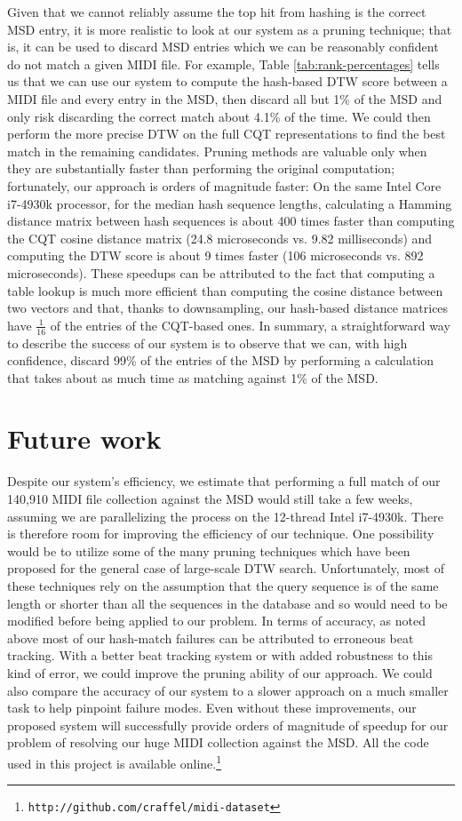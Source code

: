 \documentclass{article}
\begin{document}
Given that we cannot reliably assume the top hit from hashing is the correct MSD entry, it is more realistic to look at our system as a pruning technique; that is, it can be used to discard MSD entries which we can be reasonably confident do not match a given MIDI file.
For example, Table \ref{tab:rank-percentages} tells us that we can use our system to compute the hash-based DTW score between a MIDI file and every entry in the MSD, then discard all but 1\% of the MSD and only risk discarding the correct match about 4.1\% of the time.
We could then perform the more precise DTW on the full CQT representations to find the best match in the remaining candidates.
Pruning methods are valuable only when they are substantially faster than performing the original computation; fortunately, our approach is orders of magnitude faster:
On the same Intel Core i7-4930k processor, for the median hash sequence lengths, calculating a Hamming distance matrix between hash sequences is about 400 times faster than computing the CQT cosine distance matrix (24.8 microseconds vs. 9.82 milliseconds) and computing the DTW score is about 9 times faster (106 microseconds vs. 892 microseconds).
These speedups can be attributed to the fact that computing a table lookup is much more efficient than computing the cosine distance between two vectors and that, thanks to downsampling, our hash-based distance matrices have $\frac{1}{16}$ of the entries of the CQT-based ones.
In summary, a straightforward way to describe the success of our system is to observe that we can, with high confidence, discard 99\% of the entries of the MSD by performing a calculation that takes about as much time as matching against 1\% of the MSD.

\section{Future work}

Despite our system's efficiency, we estimate that performing a full match of our 140,910 MIDI file collection against the MSD would still take a few weeks, assuming we are parallelizing the process on the 12-thread Intel i7-4930k.
There is therefore room for improving the efficiency of our technique.
One possibility would be to utilize some of the many pruning techniques which have been proposed for the general case of large-scale DTW search.
Unfortunately, most of these techniques rely on the assumption that the query sequence is of the same length or shorter than all the sequences in the database and so would need to be modified before being applied to our problem.
In terms of accuracy, as noted above most of our hash-match failures can be attributed to erroneous beat tracking.
With a better beat tracking system or with added robustness to this kind of error, we could improve the pruning ability of our approach.
We could also compare the accuracy of our system to a slower approach on a much smaller task to help pinpoint failure modes.
Even without these improvements, our proposed system will successfully provide orders of magnitude of speedup for our problem of resolving our huge MIDI collection against the MSD.
All the code used in this project is available online.\footnote{\texttt{http://github.com/craffel/midi-dataset}}
\end{document}
